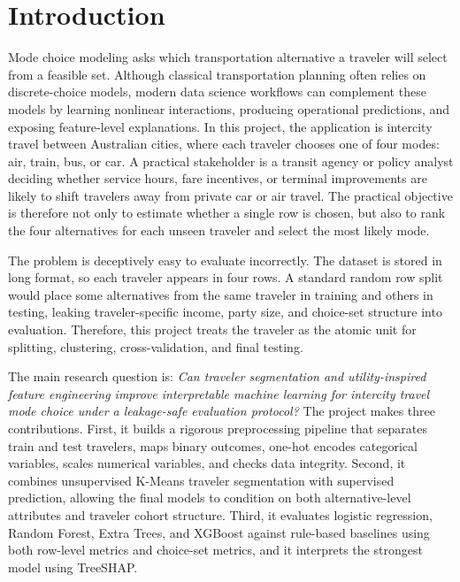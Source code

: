 \documentclass{article}
\begin{document}
\section{Introduction}
Mode choice modeling asks which transportation alternative a traveler will select from a feasible set.  Although classical transportation planning often relies on discrete-choice models, modern data science workflows can complement these models by learning nonlinear interactions, producing operational predictions, and exposing feature-level explanations.  In this project, the application is intercity travel between Australian cities, where each traveler chooses one of four modes: air, train, bus, or car.  A practical stakeholder is a transit agency or policy analyst deciding whether service hours, fare incentives, or terminal improvements are likely to shift travelers away from private car or air travel.  The practical objective is therefore not only to estimate whether a single row is chosen, but also to rank the four alternatives for each unseen traveler and select the most likely mode.

The problem is deceptively easy to evaluate incorrectly.  The dataset is stored in long format, so each traveler appears in four rows.  A standard random row split would place some alternatives from the same traveler in training and others in testing, leaking traveler-specific income, party size, and choice-set structure into evaluation.  Therefore, this project treats the traveler as the atomic unit for splitting, clustering, cross-validation, and final testing.

The main research question is: \emph{Can traveler segmentation and utility-inspired feature engineering improve interpretable machine learning for intercity travel mode choice under a leakage-safe evaluation protocol?}  The project makes three contributions.  First, it builds a rigorous preprocessing pipeline that separates train and test travelers, maps binary outcomes, one-hot encodes categorical variables, scales numerical variables, and checks data integrity.  Second, it combines unsupervised K-Means traveler segmentation with supervised prediction, allowing the final models to condition on both alternative-level attributes and traveler cohort structure.  Third, it evaluates logistic regression, Random Forest, Extra Trees, and XGBoost against rule-based baselines using both row-level metrics and choice-set metrics, and it interprets the strongest model using TreeSHAP.
\end{document}
